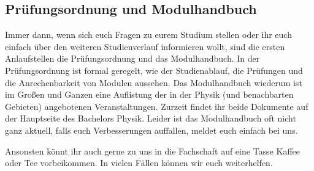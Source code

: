 \subsection{Prüfungsordnung und Modulhandbuch}

\begin{figure*}[b]
\end{figure*}

Immer dann, wenn sich euch Fragen zu eurem Studium stellen oder ihr euch einfach über den weiteren Studienverlauf informieren wollt, sind die ersten Anlaufstellen die Prüfungsordnung und das Modulhandbuch. In der Prüfungsordnung ist formal geregelt, wie der Studienablauf, die Prüfungen und die Anrechenbarkeit von Modulen aussehen. Das Modulhandbuch wiederum ist im Großen und Ganzen eine Auflistung der in der Physik (und benachbarten Gebieten) angebotenen Veranstaltungen. Zurzeit findet ihr beide Dokumente auf der Hauptseite des Bachelors Physik. Leider ist das Modulhandbuch oft nicht ganz aktuell, falls euch Verbesserungen auffallen, meldet euch einfach bei uns.

Ansonsten könnt ihr auch gerne zu uns in die Fachschaft auf eine Tasse Kaffee oder Tee vorbeikommen. In vielen Fällen können wir euch weiterhelfen.
